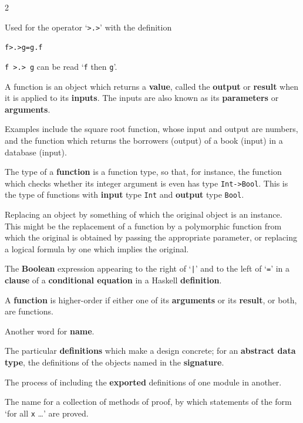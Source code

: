 \begin{multicols}{2}
{
Used for the operator `\texttt{>.>}' with the definition
\begin{alltt}
f >.> g = g . f
\end{alltt}
\texttt{f >.> g} can be read `\texttt{f} then \texttt{g}'.

A function is an object which returns a \textbf{value}, called the 
\textbf{output} or \textbf{result} when it is applied to its \textbf{inputs}. The
inputs are also known as its \textbf{parameters} or \textbf{arguments}. 
 
\noindent
Examples
include the square root function, whose input and output are numbers, and the
function which returns the borrowers (output) of a book (input) in a database
(input).

The type of a \textbf{function} is a function type, so that, for instance, the
function which checks whether its integer
argument is even has type \texttt{Int->Bool}.
This is the type of functions with \textbf{input} type \texttt{Int} and 
\textbf{output} type \texttt{Bool}.

Replacing an object by something of which the original object is an instance.
\itempar
This might be the replacement of a function by a polymorphic function
from which the original is obtained by passing the appropriate parameter, or
replacing a logical formula by one which implies the original.

The \textbf{Boolean} expression appearing to the right of `\texttt{|}' and to the left
of `\texttt{=}' in a 
\textbf{clause} of a \textbf{conditional equation} in a Haskell
\textbf{definition}.

A \textbf{function} is higher-order if either one of its \textbf{arguments} or
its \textbf{result}, or both, are functions.

 
Another word for \textbf{name}.

The particular \textbf{definitions} which make a design concrete; for an 
\textbf{abstract data type}, the definitions of the objects named in the 
\textbf{signature}.

The process of including the \textbf{exported} definitions of one module in
another.

The name for a collection of methods of proof, by which statements of the
form `for all \texttt{x} \ldots' are proved.

}
\end{multicols}
